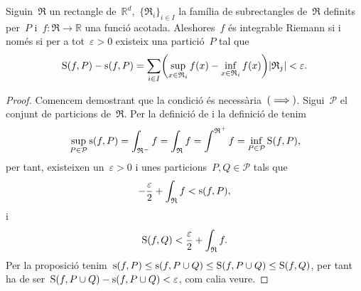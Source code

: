 \documentclass[../../main.tex]{subfiles}
\begin{document}
    \begin{theorem}
        \label{thm:Criteri d'integrabilitat Riemann}
        Siguin~\(\mathfrak{R}\) un rectangle de~\(\mathbb{R}^{d}\),\ \(\{\mathfrak{R}_{i}\}_{i\in I}\) la família de subrectangles de~\(\mathfrak{R}\) definits per~\(P\) i~\(f\colon\mathfrak{R}\to\mathbb{R}\) una funció acotada.
        Aleshores~\(f\) és integrable Riemann si i només si per a tot~\(\varepsilon>0\) existeix una partició~\(P\) tal que
        \[
            \Ssup(f,P)-\sinf(f,P)=\sum_{i\in I}\left(\sup_{x\in \mathfrak{R}_{i}}f(x)-\inf_{x\in \mathfrak{R}_{i}}f(x)\right)\abs{\mathfrak{R}_{j}}<\varepsilon.
        \]
        \begin{proof}
            Comencem demostrant que la condició és necessària~\((\implies)\).
            Sigui~\(\mathcal{P}\) el conjunt de particions de~\(\mathfrak{R}\).
            Per la definició de  i la definició de  tenim
            \[
                \sup_{P\in\mathcal{P}}\operatorname{s}(f,P)=\int_{\mathfrak{R}^{-}}f=\int_{\mathfrak{R}}f=\int^{\mathfrak{R}^{+}}f=\inf_{P\in\mathcal{P}}\operatorname{S}(f,P),
            \]
            per tant, existeixen un~\(\varepsilon>0\) i unes particions~\(P,Q\in\mathcal{P}\) tals que
            \[
                -\frac{\varepsilon}{2}+\int_{\mathfrak{R}}f<\operatorname{s}(f,P),
            \]
            i
            \[
                \operatorname{S}(f,Q)<\frac{\varepsilon}{2}+\int_{\mathfrak{R}}f.
            \]
            Per la proposició  tenim~\(\operatorname{s}(f,P)\leq\operatorname{s}(f,P\cup Q)\leq\operatorname{S}(f,P\cup Q)\leq\operatorname{S}(f,Q)\), per tant ha de ser~\(\operatorname{S}(f,P\cup Q)-\operatorname{s}(f,P\cup Q)<\varepsilon\), com calia veure.


\end{proof}
\end{theorem}
\end{document}
